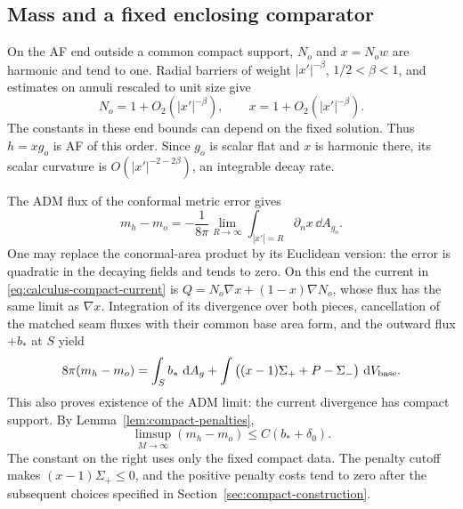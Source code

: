 \subsection{Mass and a fixed enclosing comparator}

On the AF end outside a common compact support, \(N_o\) and
\(x=N_ow\) are harmonic and tend to one.  Radial barriers of
weight \(|x'|^{-\beta}\), \(1/2<\beta<1\), and estimates on
annuli rescaled to unit size give
\begin{equation}
 N_o=1+O_2(|x'|^{-\beta}),\qquad
 x=1+O_2(|x'|^{-\beta}).
 \label{eq:unsafe-af-decay}
\end{equation}
The constants in these end bounds can depend on the fixed solution.
Thus \(h=xg_o\) is AF of this order.  Since \(g_o\) is scalar
flat and \(x\) is harmonic there, its scalar curvature is
\(O(|x'|^{-2-2\beta})\), an integrable decay rate.

The ADM flux of the conformal metric error gives
\begin{equation}
 m_h-m_o=-\frac1{8\pi}
           \lim_{R\to\infty}\int_{|x'|=R}\partial_nx\,\dd A_{g_o}.
 \label{eq:unsafe-adm-flux}
\end{equation}
One may replace the conormal-area product by its Euclidean version:
the error is quadratic in the decaying fields and tends to zero.
On this end the current in \eqref{eq:calculus-compact-current} is
\(Q=N_o\nabla x+(1-x)\nabla N_o\), whose flux has the same
limit as \(\nabla x\).  Integration of its divergence over both
pieces, cancellation of the matched seam fluxes with their common
base area form, and the outward flux \(+b_*\) at \(S\) yield
\begin{equation}
 8\pi(m_h-m_o)
   =\int_S b_*\,\mathop{}\!\mathrm d A_g
      +\int\big((x-1)\Sigma_++P-\Sigma_-\big)\,\mathop{}\!\mathrm d V_{\rm base}.
 \label{eq:unsafe-mass-budget}
\end{equation}
This also proves existence of the ADM limit: the current divergence
has compact support.  By Lemma~\ref{lem:compact-penalties},
\begin{equation}
 \limsup_{M\to\infty}(m_h-m_o)\le C(b_*+\delta_0).
 \label{eq:unsafe-mass-limsup}
\end{equation}
The constant on the right uses only the fixed compact data.  The
penalty cutoff makes \((x-1)\Sigma_+\le0\), and the positive
penalty costs tend to zero after the subsequent choices specified
in Section~\ref{sec:compact-construction}.

